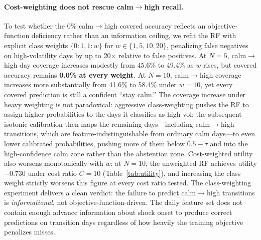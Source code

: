\documentclass[12pt]{article}
\begin{document}
\paragraph{Cost-weighting does not rescue calm$\to$high recall.}
To test whether the 0\% calm$\to$high covered accuracy reflects an objective-function deficiency rather than an information ceiling, we refit the RF with explicit class weights $\{0{:}1, 1{:}w\}$ for $w \in \{1, 5, 10, 20\}$, penalizing false negatives on high-volatility days by up to 20$\times$ relative to false positives. At $N = 5$, calm$\to$high day coverage increases modestly from 45.6\% to 49.4\% as $w$ rises, but covered accuracy remains \textbf{0.0\% at every weight}. At $N = 10$, calm$\to$high coverage increases more substantially from 41.6\% to 58.4\% under $w = 10$, yet every covered prediction is still a confident ``stay calm.'' The coverage increase under heavy weighting is not paradoxical: aggressive class-weighting pushes the RF to assign higher probabilities to the days it classifies as high-vol; the subsequent isotonic calibration then maps the remaining days---including calm$\to$high transitions, which are feature-indistinguishable from ordinary calm days---to even lower calibrated probabilities, pushing more of them below $0.5 - \tau$ and into the high-confidence calm zone rather than the abstention zone. Cost-weighted utility also worsens monotonically with $w$: at $N = 10$, the unweighted RF achieves utility $-0.730$ under cost ratio $C = 10$ (Table~\ref{tab:utility}), and increasing the class weight strictly worsens this figure at every cost ratio tested. The class-weighting experiment delivers a clean verdict: the failure to predict calm$\to$high transitions is \emph{informational}, not objective-function-driven. The daily feature set does not contain enough advance information about shock onset to produce correct predictions on transition days regardless of how heavily the training objective penalizes misses.
\end{document}
